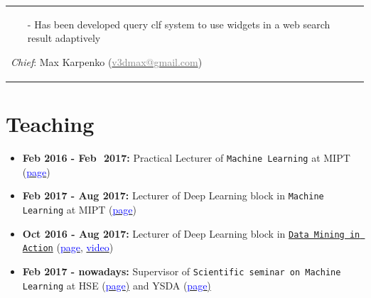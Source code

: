 \documentclass[a4paper,10pt]{article} %
\begin{document}
\begin{tabular}{l|p{11.5cm}c}
{\vspace{-0.25cm}
\begin{itemize}
	\item[-] Has been developed query clf system to use widgets in a web search result adaptively
\end{itemize}
\scriptsize{
	\emph{Chief}:  
Max Karpenko
(\href{mailto:v3dmax@gmail.com}{\textcolor{gray}{v3dmax@gmail.com}})}
\vspace{-0.1cm}
}& 
\\
\end{tabular}

\section{Teaching}
\begin{itemize}
	\item \textbf{Feb 2016 - Feb~\,2017:} Practical Lecturer of  \texttt{Machine Learning} at  MIPT {\small (}\href{https://ml-mipt.github.io}{\textcolor{blue}{page}}{\small )}
	\item  \textbf{Feb 2017 - Aug 2017:}  Lecturer of Deep Learning block in \texttt{Machine Learning} at MIPT
	{\small (}\href{https://ml-mipt.github.io/index-spring-2017/}{\textcolor{blue}{page}}{\small )}
	\item  \textbf{Oct 2016 - Aug 2017:}  Lecturer of Deep Learning block in \href{https://vk.com/data_mining_in_action}{\texttt{Data Mining in Action}}
	{\small (}\href{https://vk.com/data_mining_in_action}{\textcolor{blue}{page}},
	\href{https://www.youtube.com/channel/UCop3CelRVvrchG5lsPyxvHg}{\textcolor{blue}{video}}{\small )}
	
	\item  \textbf{Feb 2017 - nowadays:} Supervisor of \texttt{Scientific seminar on Machine Learning} at 
	HSE {\small (}\href{https://goo.gl/xuuRWx}{\textcolor{blue}{page}{\small)}} and 
	YSDA  {\small (}\href{https://yandexdataschool.com}{\textcolor{blue}{page}{\small)}} 
\end{itemize}
\end{document}
